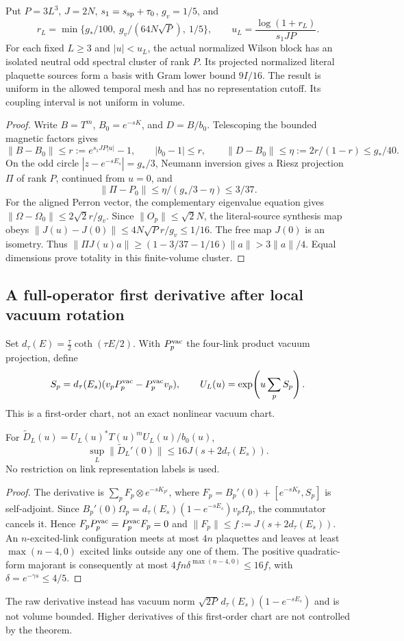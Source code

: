 \begin{theorem}
Put $P=3L^3$, $J=2N$, $s_1=s_{\rm sp}+\tau_0$, $g_v=1/5$, and
\[
 r_L=\min\{g_*/100,\ g_v/(64N\sqrt P),\ 1/5\},\qquad
 u_L=\frac{\log(1+r_L)}{s_1JP}.
\]
For each fixed $L\ge3$ and $|u|<u_L$, the actual normalized Wilson block
has an isolated neutral odd spectral cluster of rank $P$. Its projected
normalized literal plaquette sources form a basis with Gram lower bound
$9I/16$. The result is uniform in the allowed temporal mesh and has no
representation cutoff. Its coupling interval is not uniform in volume.
\end{theorem}
\begin{proof}
Write $B=T^m$, $B_0=e^{-sK}$, and $D=B/b_0$. Telescoping the bounded
magnetic factors gives
\[
 \|B-B_0\|\le r:=e^{s_1JP|u|}-1,\qquad |b_0-1|\le r,
 \qquad \|D-B_0\|\le\eta:=2r/(1-r)\le g_*/40.
\]
On the odd circle $|z-e^{-sE_s}|=g_*/3$, Neumann inversion gives a Riesz
projection $\Pi$ of rank $P$, continued from $u=0$, and
\[
 \|\Pi-P_0\|\le\eta/(g_*/3-\eta)\le3/37.
\]
For the aligned Perron vector, the complementary eigenvalue equation gives
$\|\Omega-\Omega_0\|\le2\sqrt2r/g_v$.
Since $\|O_p\|\le\sqrt2N$, the literal-source synthesis map obeys
$\|J(u)-J(0)\|\le4N\sqrt P r/g_v\le1/16$. The free map $J(0)$ is an
isometry. Thus $\|\Pi J(u)a\|\ge(1-3/37-1/16)\|a\|>3\|a\|/4$.
Equal dimensions prove totality in this finite-volume cluster.
\end{proof}

\subsection{A full-operator first derivative after local vacuum rotation}
Set $d_\tau(E)=\frac\tau2\coth(\tau E/2)$. With $P_p^{\rm vac}$ the
four-link product vacuum projection, define
\[
 S_p=d_\tau(E_s)(v_pP_p^{\rm vac}-P_p^{\rm vac}v_p),\qquad
 U_L(u)=\exp\!\left(u\sum_pS_p\right).
\]
This is a first-order chart, not an exact nonlinear vacuum chart.

\begin{theorem}
For $\widetilde D_L(u)=U_L(u)^*T(u)^mU_L(u)/b_0(u)$,
\[
 \sup_L\|\widetilde D_L'(0)\|\le16J(s+2d_\tau(E_s)).
\]
No restriction on link representation labels is used.
\end{theorem}
\begin{proof}
The derivative is
$\sum_pF_p\otimes e^{-sK_{p^c}}$, where
$F_p=B_p'(0)+[e^{-sK_p},S_p]$ is self-adjoint. Since
$B_p'(0)\Omega_p=d_\tau(E_s)(1-e^{-sE_s})v_p\Omega_p$, the commutator
cancels it. Hence $F_pP_p^{\rm vac}=P_p^{\rm vac}F_p=0$ and
$\|F_p\|\le f:=J(s+2d_\tau(E_s))$.
An $n$-excited-link configuration meets at most $4n$ plaquettes and leaves
at least $\max(n-4,0)$ excited links outside any one of them. The positive
quadratic-form majorant is consequently at most
$4fn\delta^{\max(n-4,0)}\le16f$, with $\delta=e^{-\gamma s}\le4/5$.
\end{proof}
The raw derivative instead has vacuum norm
$\sqrt{2P}\,d_\tau(E_s)(1-e^{-sE_s})$ and is not volume bounded.
Higher derivatives of this first-order chart are not controlled by the theorem.

